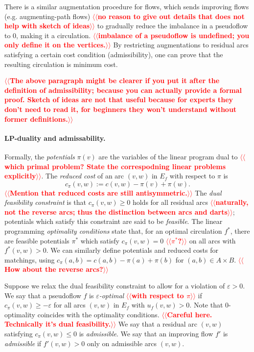 \documentclass[11pt]{article}
\makeatletter
\def\eps{\varepsilon}
\theoremstyle{plain}
\numberwithin{figure}{section}
\def\n@te#1{\textsf{\boldmath \textbf{$\langle\!\langle$#1$\rangle\!\rangle$}}\leavevmode}
\def\note#1{\textcolor{red}{\n@te{#1}}}
\makeatother
\begin{document}
There is a similar augmentation procedure for flows, which sends improving
flows (e.g. augmenting-path flows) \note{no reason to give out details that does not help with sketch of ideas} to gradually reduce the imbalance in a
pseudoflow to 0, making it a circulation. \note{imbalance of a pseudoflow is undefined; you only define it on the vertices.}
By restricting augmentations to residual arcs satisfying a certain cost
condition (admissibility), one can prove that the resulting circulation is
minimum cost.

\note{The above paragraph might be clearer if you put it after the definition of admissibility; because you can actually provide a formal proof.  Sketch of ideas are not that useful because for experts they don't need to read it, for beginners they won't understand without former definitions.}

\paragraph{LP-duality and admissability.}
Formally, the
\emph{potentials} $\pi(v)$ are the variables of the linear program dual to \note{which primal problem? State the correspodning linear problems explicitly}.
The \emph{reduced cost} of an arc $(v, w)$ in $E_f$ with respect to $\pi$ is
\[
c_\pi(v, w) := c(v, w) - \pi(v) + \pi(w).
\]
\note{Mention that reduced costs are still antisymmetric.}
The \emph{dual feasibility constraint} is that $c_\pi(v, w) \geq 0$ holds for all
residual arcs \note{naturally, not the reverse arcs; thus the distinction between arcs and darts}; potentials which satisfy this constraint are said to be \emph{feasible}.
The linear programming \emph{optimality conditions} state that, for an optimal
circulation $f^*$, there are feasible potentials $\pi^*$ which satisfy
$c_\pi(v, w) = 0$ \note{$\pi^*$?} on all arcs with $f^*(v, w) > 0$.
We can similarly define potentials and reduced costs for matchings, using
$c_\pi(a, b) = c(a, b) - \pi(a) + \pi(b)$ for $(a, b) \in A \times B$. \note{How about the reverse arcs?}

Suppose we relax the dual feasibility constraint to allow for a violation of
$\eps > 0$.
We say that a pseudoflow $f$ is \emph{$\eps$-optimal} \note{with respect to $\pi$} if
$c_\pi(v, w) \geq -\eps$ for all arcs $(v, w)$ in $E_f$ with $u_f(v, w) > 0$.
Note that 0-optimality coincides with the optimality conditions. \note{Careful here.  Technically it's dual feasibility.}
We say that a residual arc $(v ,w)$ satisfying $c_\pi(v, w) \leq 0$ is \emph{admissible}.
We say that an improving flow $f'$ is \emph{admissible} if $f'(v, w) > 0$
only on admissible arcs $(v, w)$.
\end{document}
